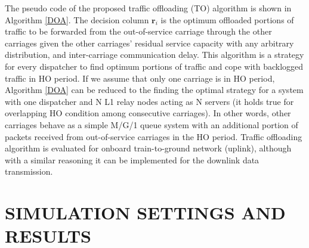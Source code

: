 \documentclass[journal]{IEEEtran}
\begin{document}
{The pseudo code of the proposed traffic offloading (TO) algorithm is shown in Algorithm \ref{DOA}. The decision column $\textbf{r}_i$ is the optimum offloaded portions of traffic to be forwarded from the out-of-service carriage through the other carriages given the other carriages’ residual service capacity with any arbitrary distribution, and inter-carriage communication delay. This algorithm is a strategy for every dispatcher to find optimum portions of traffic and cope with backlogged traffic in HO period. If we assume that only one carriage is in HO period, Algorithm \ref{DOA} can be reduced to the finding the optimal strategy for a system with one dispatcher and N L1 relay nodes acting as N servers (it holds true for overlapping HO condition among consecutive carriages). In other words, other carriages behave as a simple M/G/1 queue system with an additional portion of packets received from out-of-service carriages in the HO period. Traffic offloading algorithm is evaluated for onboard train-to-ground network (uplink), although with a similar reasoning it can be implemented for the downlink data transmission. 


\section{SIMULATION SETTINGS AND RESULTS}
\label{sec4}


}
\end{document}
